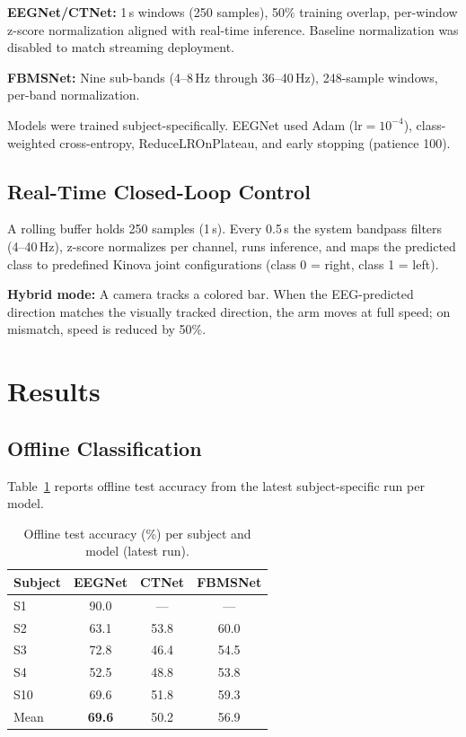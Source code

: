 \documentclass[conference]{IEEEtran}
\begin{document}
\textbf{EEGNet/CTNet:} 1\,s windows (250 samples), 50\% training overlap, per-window z-score normalization aligned with real-time inference. Baseline normalization was disabled to match streaming deployment.

\textbf{FBMSNet:} Nine sub-bands (4--8\,Hz through 36--40\,Hz), 248-sample windows, per-band normalization.

Models were trained subject-specifically. EEGNet used Adam ($\text{lr}=10^{-4}$), class-weighted cross-entropy, ReduceLROnPlateau, and early stopping (patience 100).

\subsection{Real-Time Closed-Loop Control}
A rolling buffer holds 250 samples (1\,s). Every 0.5\,s the system bandpass filters (4--40\,Hz), z-score normalizes per channel, runs inference, and maps the predicted class to predefined Kinova joint configurations (class 0 = right, class 1 = left).

\textbf{Hybrid mode:} A camera tracks a colored bar. When the EEG-predicted direction matches the visually tracked direction, the arm moves at full speed; on mismatch, speed is reduced by 50\%.

\section{Results}

\subsection{Offline Classification}
Table~\ref{tab:accuracy} reports offline test accuracy from the latest subject-specific run per model.

\begin{table}[htbp]
\caption{Offline test accuracy (\%) per subject and model (latest run).}
\label{tab:accuracy}
\begin{center}
\begin{tabular}{lccc}
\toprule
\textbf{Subject} & \textbf{EEGNet} & \textbf{CTNet} & \textbf{FBMSNet} \\
\midrule
S1  & 90.0 & ---  & ---  \\
S2  & 63.1 & 53.8 & 60.0 \\
S3  & 72.8 & 46.4 & 54.5 \\
S4  & 52.5 & 48.8 & 53.8 \\
S10 & 69.6 & 51.8 & 59.3 \\
\midrule
Mean & \textbf{69.6} & 50.2 & 56.9 \\
\bottomrule
\end{tabular}
\end{center}
\end{table}
\end{document}
